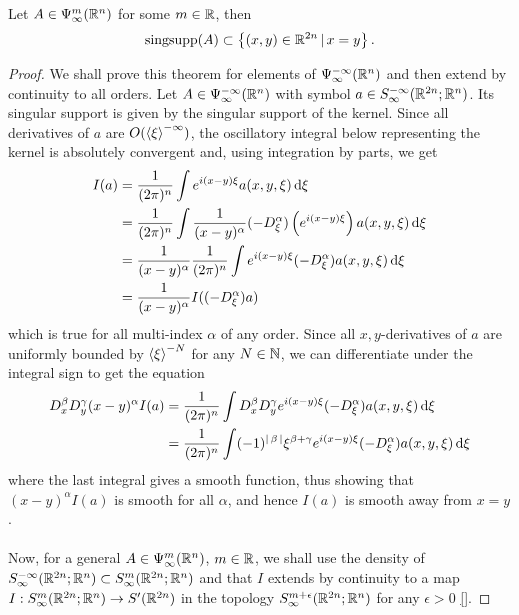 \documentclass[12pt]{article}
\begin{document}
\begin{fprop}
    Let $A \in \Psi^m_\infty(\R^n)$ for some $m \in \R$, then
    \[
    \mathrm{sing supp}(A) \subset \set{(x, y) \in \R^{2n} \wh x = y}. 
    \]
\end{fprop}
\begin{proof}
    We shall prove this theorem for elements of $\Psi^{-\infty}_\infty(\R^n)$ and then extend by continuity to all orders. 
    Let $A \in \Psi^{-\infty}_\infty(\R^n)$ with symbol $a \in S^{-\infty}_\infty(\R^{2n}; \R^n)$. Its singular support is given by the singular support of the kernel. Since all derivatives of $a$ are $O(\sym[\xi]^{-\infty})$, the oscillatory integral below representing the kernel is absolutely convergent  and, using integration by parts, we get
    \begin{align*}
    I(a) 
    & = \frac{1}{(2\pi)^n} \int e^{i(x - y) \xi} a(x, y, \xi) \d[\xi] \\
    & = \frac{1}{(2\pi)^n}  \int \frac{1}{(x - y)^\alpha} (-D^\alpha_\xi) \brac{e^{i(x - y) \xi} }a(x, y, \xi) \d[\xi] \\
    & = \frac{1}{(x - y)^\alpha} \frac{1}{(2\pi)^n} \int e^{i(x - y) \xi} (-D^\alpha_\xi) a(x, y, \xi) \d[\xi] \\
    & = \frac{1}{(x - y)^\alpha} I((-D^\alpha_\xi)a)
    \end{align*}
    which is true for all multi-index $\alpha$ of any order. Since all $x, y$-derivatives of $a$ are uniformly bounded by $\sym[\xi]^{-N}$ for any $N \in \N$, we can differentiate under the integral sign to get the equation
    \begin{align*}
    D^\beta_x D^\gamma_y (x - y)^\alpha I(a) 
    & = \frac{1}{(2\pi)^n} \int D^\beta_x D^\gamma_y e^{i(x - y) \xi} (-D^\alpha_\xi) a(x, y, \xi) \d[\xi] \\
    & = \frac{1}{(2\pi)^n} \int (-1)^{\abs{\beta}}\xi^{\beta + \gamma}e^{i(x - y) \xi} (-D^\alpha_\xi) a(x, y, \xi) \d[\xi] \\
    \end{align*}
    where the last integral gives a smooth function, thus showing that $(x - y)^\alpha I(a)$ is smooth for all $\alpha$, and hence $I(a)$ is smooth away from $x = y$. \\
    \\
    Now, for a general $A \in \Psi^m_\infty(\R^n)$, $m \in \R$, we shall use the  density of $S^{-\infty}_\infty(\R^{2n}; \R^n) \subset S^{m}_\infty(\R^{2n}; \R^n)$ and that $I$ extends by continuity to a map $I : S^{m}_\infty(\R^{2n}; \R^n) \to S'(\R^{2n})$ in the topology $S^{m + \epsilon}_\infty(\R^{2n}; \R^n)$ for any $\epsilon > 0$  \ref{}. 
    
    
\end{proof}
\end{document}
